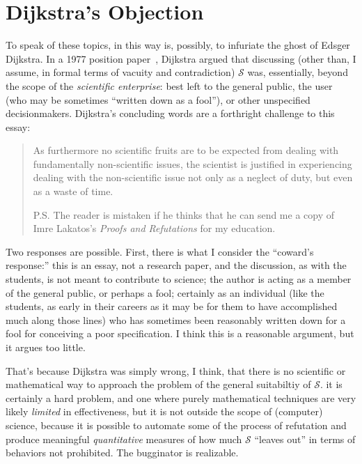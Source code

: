 \documentclass[sigplan]{acmart}
\begin{document}
\section{Dijkstra's Objection}

To speak of these topics, in this way is, possibly, to infuriate the
ghost of Edsger Dijkstra.  In a 1977 position paper~\cite{dijkstra1977position}, Dijkstra argued
that discussing (other than, I assume, in formal terms of vacuity and
contradiction) $\mathcal{S}$ was, essentially, beyond the scope of the
\emph{scientific enterprise}:  best left to the general public, the
user (who may be sometimes ``written down as a fool''), or other
unspecified decisionmakers.  Dijkstra's concluding words are a
forthright challenge to this essay:

\begin{quote}
  As furthermore no scientific fruits are to be expected from dealing with fundamentally non-scientific issues, the scientist is justified in experiencing dealing with the non-scientific issue not only as a neglect of duty, but even as a waste of time.

P.S. The reader is mistaken if he thinks that he can send me a copy of Imre Lakatos’s \emph{Proofs and Refutations} for my education.
\end{quote}

Two responses are possible.  First, there is what I consider the
``coward's response:''  this is an essay, not a research paper, and
the discussion, as with the students, is not meant to contribute to
science; the author is acting as a member of the general public, or perhaps a fool;
certainly as an individual (like the students, as early in their
careers as it may be for them to have accomplished much along those
lines) who has sometimes been reasonably written down for a fool for
conceiving a poor specification.  I think this is a reasonable
argument, but it argues
too little.

That's because Dijkstra was simply wrong, I think, that there is no scientific or
mathematical way to approach the problem of the general suitabiltiy of
$\mathcal{S}$. it is certainly a hard problem, and one where purely mathematical
techniques are very likely \emph{limited} in effectiveness, but it is not outside the
scope of (computer) science, because it is possible to automate some of the
process of refutation and produce meaningful \emph{quantitative} measures of how much
$\mathcal{S}$ ``leaves out'' in terms of behaviors not prohibited.
The bugginator is realizable.
\end{document}
